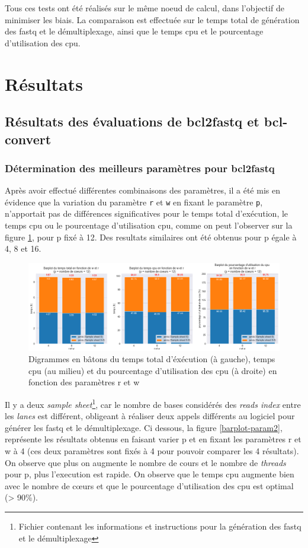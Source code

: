Tous ces tests ont été  réalisés sur le même noeud de calcul, dans l'objectif de minimiser les biais. La comparaison est effectuée sur le temps total de génération des fastq et le démultiplexage, ainsi que le temps cpu et le pourcentage d'utilisation des cpu.

\section{Résultats}
\subsection{Résultats des évaluations de bcl2fastq et bcl-convert}
\subsubsection{Détermination des meilleurs paramètres pour bcl2fastq}
Après avoir effectué différentes combinaisons des paramètres, il a été mis en évidence que la variation du paramètre \texttt{r} et \texttt{w} en fixant le paramètre \texttt{p}, n'apportait pas de différences significatives pour le temps total d'exécution, le temps cpu ou le pourcentage d'utilisation cpu, comme on peut l'observer sur la figure \ref{barplot-param}, pour p fixé à 12. Des resultats similaires ont été obtenus pour p égale à 4, 8 et 16. 

\begin{figure}[H]
    \centering
    \includegraphics[width=1\textwidth]{img/barplot_cum_jarvis2.png}
    \caption{\footnotesize{Digrammes en bâtons du temps total d'éxécution (à gauche), temps cpu (au milieu) et du pourcentage d'utilisation des cpu (à droite) en fonction des paramètres r et w}}
    \label{barplot-param}
\end{figure} 
Il y a deux \emph{sample sheet}\footnote{Fichier contenant les informations et instructions pour la génération des fastq et le démultiplexage}, car le nombre de bases considérés des \emph{reads index} entre les \emph{lanes} est différent, obligeant à réaliser deux appels différents au logiciel pour générer les fastq et le démultiplexage. Ci dessous, la figure \ref{barplot-param2}, représente les résultats obtenus en faisant varier p et en fixant les paramètres r et w à 4 (ces deux paramètres sont fixés à 4 pour pouvoir comparer les 4 résultats). On observe que plus on augmente le nombre de cours et le nombre de \emph{threads} pour p, plus l'execution est rapide. On observe que le temps cpu augmente bien avec le nombre de cœurs et que le pourcentage d'utilisation des cpu est optimal (> 90\%).

